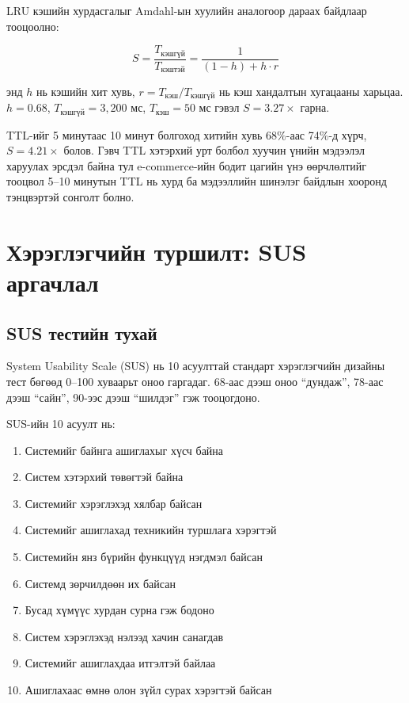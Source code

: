 \documentclass[12pt,a4paper]{report}
\begin{document}
LRU кэшийн хурдасгалыг Amdahl-ын хуулийн аналогоор дараах байдлаар тооцоолно:

\begin{equation}
S = \frac{T_{\text{кэшгүй}}}{T_{\text{кэштэй}}} = \frac{1}{(1 - h) + h \cdot r}
\label{eq:cache_speedup}
\end{equation}

\noindent энд $h$ нь кэшийн хит хувь, $r = T_{\text{кэш}} / T_{\text{кэшгүй}}$ нь кэш хандалтын хугацааны харьцаа. $h = 0.68$, $T_{\text{кэшгүй}} = 3{,}200$ мс, $T_{\text{кэш}} = 50$ мс гэвэл $S = 3.27\times$ гарна.

TTL-ийг 5 минутаас 10 минут болгоход хитийн хувь 68\%-аас 74\%-д хүрч, $S = 4.21\times$ болов. Гэвч TTL хэтэрхий урт болбол хуучин үнийн мэдээлэл харуулах эрсдэл байна тул e-commerce-ийн бодит цагийн үнэ өөрчлөлтийг тооцвол 5--10 минутын TTL нь хурд ба мэдээллийн шинэлэг байдлын хооронд тэнцвэртэй сонголт болно.

\section{Хэрэглэгчийн туршилт: SUS аргачлал}

\subsection{SUS тестийн тухай}

System Usability Scale (SUS) \cite{brooke1996sus} нь 10 асуулттай стандарт хэрэглэгчийн дизайны тест бөгөөд 0--100 хуваарьт оноо гаргадаг. 68-аас дээш оноо ``дундаж'', 78-аас дээш ``сайн'', 90-ээс дээш ``шилдэг'' гэж тооцогдоно.

SUS-ийн 10 асуулт нь:
\begin{enumerate}[leftmargin=1.5cm]
  \item Системийг байнга ашиглахыг хүсч байна
  \item Систем хэтэрхий төвөгтэй байна
  \item Системийг хэрэглэхэд хялбар байсан
  \item Системийг ашиглахад техникийн туршлага хэрэгтэй
  \item Системийн янз бүрийн функцүүд нэгдмэл байсан
  \item Системд зөрчилдөөн их байсан
  \item Бусад хүмүүс хурдан сурна гэж бодоно
  \item Систем хэрэглэхэд нэлээд хачин санагдав
  \item Системийг ашиглахдаа итгэлтэй байлаа
  \item Ашиглахаас өмнө олон зүйл сурах хэрэгтэй байсан
\end{enumerate}
\end{document}
